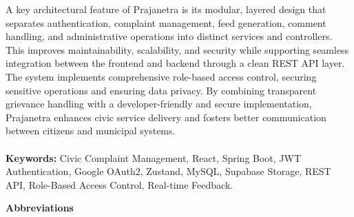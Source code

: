 \documentclass[12pt,a4paper]{report}
\begin{document}
A key architectural feature of Prajanetra is its modular, layered design that separates authentication, complaint management, feed generation, comment handling, and administrative operations into distinct services and controllers. This improves maintainability, scalability, and security while supporting seamless integration between the frontend and backend through a clean REST API layer. The system implements comprehensive role-based access control, securing sensitive operations and ensuring data privacy. By combining transparent grievance handling with a developer-friendly and secure implementation, Prajanetra enhances civic service delivery and fosters better communication between citizens and municipal systems.\\\\
\textbf{Keywords:} Civic Complaint Management, React, Spring Boot, JWT Authentication, Google OAuth2, Zustand, MySQL, Supabase Storage, REST API, Role-Based Access Control, Real-time Feedback.

\newpage
{}
\tableofcontents

\newpage
{}
\listoffigures

\newpage
{}
\listoftables

\newpage
\begin{center}
    \begin{LARGE}
        \textbf{Abbreviations}
    \end{LARGE}
\end{center}
\vspace{0.4in}
\end{document}
